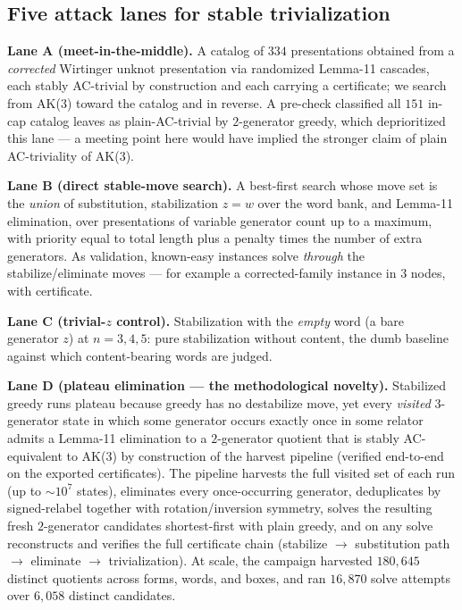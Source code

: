 \subsection{Five attack lanes for stable trivialization}

\textbf{Lane A (meet-in-the-middle).} A catalog of $334$ presentations obtained from a
\emph{corrected} Wirtinger unknot presentation via randomized Lemma-11 cascades, each
stably AC-trivial by construction and each carrying a certificate; we search from AK(3)
toward the catalog and in reverse. A pre-check classified all $151$ in-cap catalog leaves
as plain-AC-trivial by $2$-generator greedy, which deprioritized this lane --- a meeting
point here would have implied the stronger claim of plain AC-triviality of AK(3).

\textbf{Lane B (direct stable-move search).} A best-first search whose move set is the
\emph{union} of substitution, stabilization $z=w$ over the word bank, and Lemma-11
elimination, over presentations of variable generator count up to a maximum, with priority
equal to total length plus a penalty times the number of extra generators. As validation,
known-easy instances solve \emph{through} the stabilize/eliminate moves --- for example a
corrected-family instance in $3$ nodes, with certificate.

\textbf{Lane C (trivial-$z$ control).} Stabilization with the \emph{empty} word (a bare
generator $z$) at $n=3,4,5$: pure stabilization without content, the dumb baseline against
which content-bearing words are judged.

\textbf{Lane D (plateau elimination --- the methodological novelty).} Stabilized greedy runs
plateau because greedy has no destabilize move, yet every \emph{visited} $3$-generator
state in which some generator occurs exactly once in some relator admits a Lemma-11
elimination to a $2$-generator quotient that is stably AC-equivalent to AK(3) by
construction of the harvest pipeline (verified end-to-end on the exported certificates).
The pipeline harvests the full visited set of each run (up to ${\sim}10^7$ states),
eliminates every once-occurring generator, deduplicates by signed-relabel together with
rotation/inversion symmetry, solves the resulting fresh $2$-generator candidates
shortest-first with plain greedy, and on any solve reconstructs and verifies the full
certificate chain (stabilize $\to$ substitution path $\to$ eliminate $\to$ trivialization).
At scale, the campaign harvested $180{,}645$ distinct quotients across forms, words, and
boxes, and ran $16{,}870$ solve attempts over $6{,}058$ distinct candidates.

